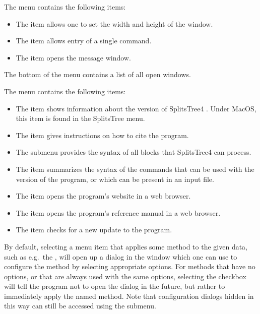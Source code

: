 \documentclass[11pt]{article}
\def\SplitsTree{{\sf SplitsTree4 }}
\begin{document}
The  menu contains the following items:
\begin{itemize}
\item The  item allows one to set the width and height of the window.
\item The  item
allows entry of a single command.
\item The  item
opens the message window.
\end{itemize}
The bottom of the  menu contains a list of all open windows.

The  menu contains the following items:
\begin{itemize}
\item The  item
shows information about the version of \SplitsTree.
Under MacOS, this item is found in the SplitsTree menu.
\item The  item
gives instructions on how to cite the program.
\item The  submenu
provides the syntax of all  blocks that \SplitsTree can process.
\item The  item
summarizes the syntax of the commands that can be used with the
version of the program, or which can be present in an input file.
\item The  item opens the program's website in a web browser.
\item The  item opens the program's reference manual in a web browser.
\item The  item checks for a new update to the program.
\end{itemize}





By default, selecting a menu item that applies some method to the given
data, such as e.g.\ the , will open up a
dialog in the  window which one can use to configure the
method by selecting appropriate options.
For methods that have no options, or that are always used with the same
options, selecting the  checkbox will tell the program not to open the dialog in the future,
but rather to immediately apply the named method.
Note that configuration dialogs hidden in this way can still be accessed
using the  submenu.
\end{document}
